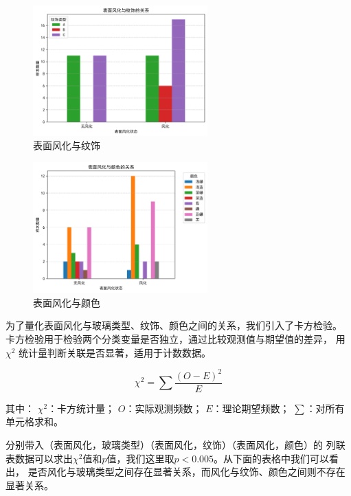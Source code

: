 \documentclass[withoutpreface,bwprint]{cumcmthesis}
\begin{document}
\begin{figure}[ht]
\centering
\includegraphics[width=0.6\textwidth]{figures/V4/1-2.png}
\caption{表面风化与纹饰}
\label{fig:表面风化与纹饰}
\end{figure}

\begin{figure}[ht]
\centering
\includegraphics[width=0.6\textwidth]{figures/V4/1-3.png}
\caption{表面风化与颜色}
\label{fig:表面风化与颜色}
\end{figure}

为了量化表面风化与玻璃类型、纹饰、颜色之间的关系，我们引入了卡方检验。
卡方检验用于检验两个分类变量是否独立，通过比较观测值与期望值的差异，
用 $\chi^2$ 统计量判断关联是否显著，适用于计数数据。


\begin{equation}
\label{eq:公式1}
\chi^2 = \sum \frac{(O - E)^2}{E}
\end{equation}

其中：
 $\chi^2$：卡方统计量；
 $O$：实际观测频数；
 $E$：理论期望频数；
 $\sum$：对所有单元格求和。

分别带入（表面风化，玻璃类型）（表面风化，纹饰）（表面风化，颜色）的
列联表数据可以求出$\chi^2$值和$p$值，我们这里取$p<0.005$。从下面的表格中我们可以看出，
是否风化与玻璃类型之间存在显著关系，而风化与纹饰、颜色之间则不存在显著关系。
\end{document}
